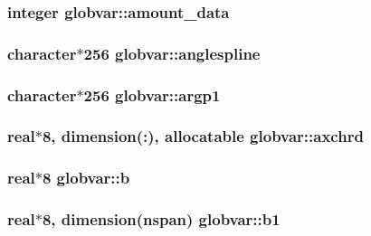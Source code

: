 \subsubsection[{amount\+\_\+data}]{\setlength{\rightskip}{0pt plus 5cm}integer globvar\+::amount\+\_\+data}\label{namespaceglobvar_ace5a9b2d41e77ec26c678a7755174bf2}
\hypertarget{namespaceglobvar_a35d25dc36b9abbf2f578dcdb231ba86d}{}
\subsubsection[{anglespline}]{\setlength{\rightskip}{0pt plus 5cm}character$\ast$256 globvar\+::anglespline}\label{namespaceglobvar_a35d25dc36b9abbf2f578dcdb231ba86d}
\hypertarget{namespaceglobvar_a3ee916788a2f55473d7d6dd7ba5137f7}{}
\subsubsection[{argp1}]{\setlength{\rightskip}{0pt plus 5cm}character$\ast$256 globvar\+::argp1}\label{namespaceglobvar_a3ee916788a2f55473d7d6dd7ba5137f7}
\hypertarget{namespaceglobvar_aca0371a5b6c784a105a1c64ced0e28f5}{}
\subsubsection[{axchrd}]{\setlength{\rightskip}{0pt plus 5cm}real$\ast$8, dimension(\+:), allocatable globvar\+::axchrd}\label{namespaceglobvar_aca0371a5b6c784a105a1c64ced0e28f5}
\hypertarget{namespaceglobvar_a8accedd2450a13e63eb70b05d0528797}{}
\subsubsection[{b}]{\setlength{\rightskip}{0pt plus 5cm}real$\ast$8 globvar\+::b}\label{namespaceglobvar_a8accedd2450a13e63eb70b05d0528797}
\hypertarget{namespaceglobvar_a957461f913a85866eb6d67bc8660bc5d}{}
\subsubsection[{b1}]{\setlength{\rightskip}{0pt plus 5cm}real$\ast$8, dimension({\bf nspan}) globvar\+::b1}\label{namespaceglobvar_a957461f913a85866eb6d67bc8660bc5d}
\hypertarget{namespaceglobvar_a6c6b282f127b3722eee82e9d331f535e}{}

